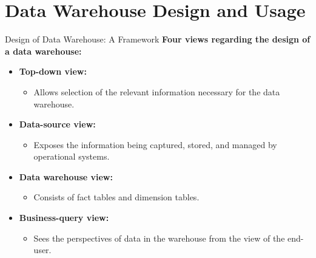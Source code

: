 \section{Data Warehouse Design and Usage}

\begin{frame}{Design of Data Warehouse: A Framework}
	\textbf{Four views regarding the design of a data warehouse:}
	\begin{itemize}
		\item \textbf{\color{airforceblue}Top-down view:}
		      \begin{itemize}
			      \item Allows selection of the relevant information necessary for the data warehouse.
		      \end{itemize}
		\item \textbf{\color{airforceblue}Data-source view:}
		      \begin{itemize}
			      \item Exposes the information being captured, stored, and managed by operational systems.
		      \end{itemize}
		\item \textbf{\color{airforceblue}Data warehouse view:}
		      \begin{itemize}
			      \item Consists of fact tables and dimension tables.
		      \end{itemize}
		\item \textbf{\color{airforceblue}Business-query view:}
		      \begin{itemize}
			      \item Sees the perspectives of data in the warehouse from the view of the end-user.
		      \end{itemize}
	\end{itemize}
\end{frame}

